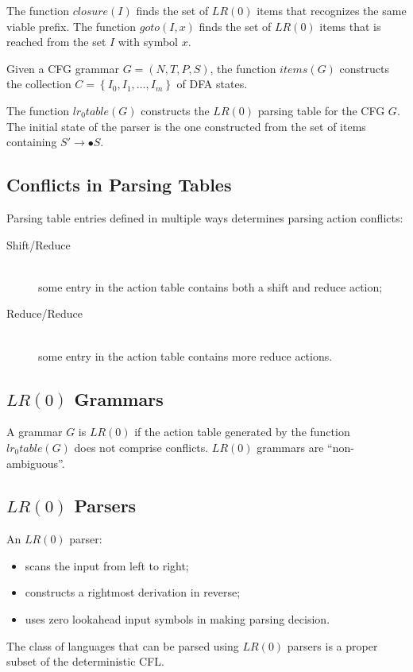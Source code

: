 The function $closure(I)$ finds the set of $LR(0)$ items that recognizes the same viable prefix.
The function $goto(I, x)$ finds the set of $LR(0)$ items that is reached from the set $I$ with symbol $x$.

Given a CFG grammar $G = (N, T, P, S)$, the function $items(G)$ constructs the collection $C = \left\{I_0, I_1, \ldots, I_m\right\}$ of DFA states.

The function $lr_0table(G)$ constructs the $LR(0)$ parsing table for the CFG $G$.
The initial state of the parser is the one constructed from the set of items containing $S' \to \bullet S$.

\subsection{Conflicts in Parsing Tables}
Parsing table entries defined in multiple ways determines parsing action conflicts:
\begin{description}
	\item[Shift/Reduce]\mbox{}\\
	some entry in the action table contains both a shift and reduce action;
	\item[Reduce/Reduce]\mbox{}\\
	some entry in the action table contains more reduce actions.
\end{description}

\subsection{$LR(0)$ Grammars}
A grammar $G$ is $LR(0)$ if the action table generated by the function $lr_0table(G)$ does not comprise conflicts.
$LR(0)$ grammars are ``non-ambiguous''.

\subsection{$LR(0)$ Parsers}
An $LR(0)$ parser:
\begin{itemize}
	\item scans the input from left to right;
	\item constructs a rightmost derivation in reverse;
	\item uses zero lookahead input symbols in making parsing decision.
\end{itemize}
The class of languages that can be parsed using $LR(0)$ parsers is a proper subset of the deterministic CFL.


